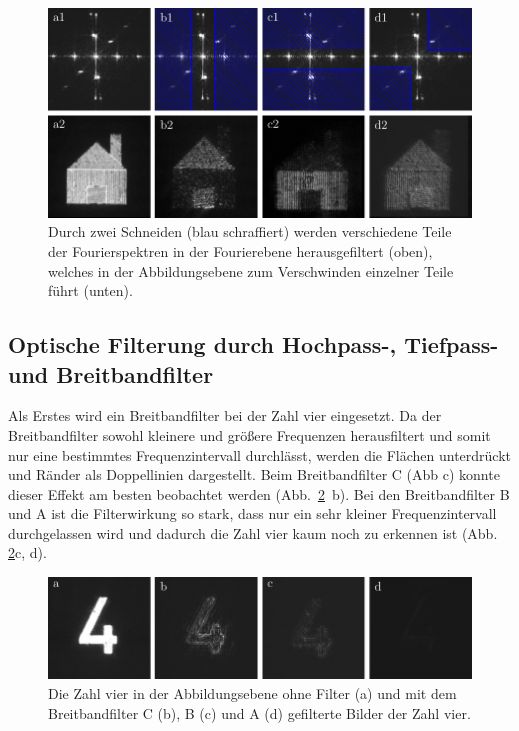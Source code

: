 \begin{figure}[h]
	\centering
	\includegraphics[scale=1]{images/Regina/abb21.pdf}
	
	\caption[Fourierhaus mit verschiedenen Filtern]{
		Durch zwei Schneiden (blau schraffiert) werden verschiedene Teile der Fourierspektren in der Fourierebene herausgefiltert (oben), welches in der Abbildungsebene zum Verschwinden einzelner Teile führt (unten).
	}
	\label{fig:fourierhaus_mit_filtern}
\end{figure}

\subsection{Optische Filterung durch Hochpass-, Tiefpass- und Breitbandfilter}

Als Erstes wird ein Breitbandfilter bei der Zahl vier eingesetzt. Da der Breitbandfilter sowohl kleinere und größere Frequenzen herausfiltert und somit nur eine bestimmtes Frequenzintervall durchlässt, werden die Flächen unterdrückt und Ränder als Doppellinien dargestellt. Beim Breitbandfilter C (Abb %
c) konnte dieser Effekt am besten beobachtet werden (Abb.~\ref{fig:vier_mit_breitband}~b). Bei den Breitbandfilter B und A ist die Filterwirkung so stark, dass nur
ein sehr kleiner Frequenzintervall durchgelassen wird und dadurch die Zahl vier kaum noch zu erkennen ist (Abb. \ref{fig:vier_mit_breitband}c, d).

\begin{figure}[h]
	\centering
	\includegraphics{images/Regina/abb22.pdf}
	\caption[Zahl 4 mit Breitbandfiltern]{
		Die Zahl vier in  der Abbildungsebene ohne Filter (a) und mit dem Breitbandfilter C (b), B (c) und A (d) gefilterte Bilder der Zahl vier.
	}
	\label{fig:vier_mit_breitband}
\end{figure}


